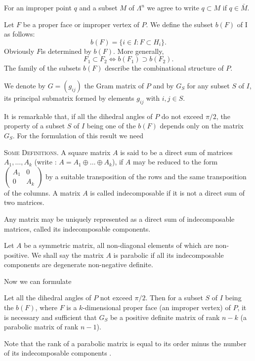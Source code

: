\begin{enumerate}
For an improper point $q$ and a subset $M$ of $\Lambda^{n}$ we agree to write $q \subset M$ if $q \in \bar{M}$.

Let $F$ be a proper face or improper vertex of $P$. We define the subset $b(F)$ of I as follows:
$$
b(F) = \{i \in I: F \subset H_i\}.
$$
Obviously $F$\pageoriginale is determined by $b(F)$. More generally,
$$
F_1 \subset F_2 \Leftrightarrow b(F_1) \supset b (F_2).
$$
The family of the subsets $b(F)$ describe the combinational structure of $P$.

We denote by $G = (g_{ij})$ the Gram matrix of $P$ and by $G_S$ for any subset $S$ of $I$, its principal submatrix formed by elements  $g_{ij}$ with $i, j \in S$.

It is remarkable that, if all the dihedral angles of $P$ do not exceed $\pi/2$, the property of a subset $S$ of $I$ being one of the $b(F)$ depends only on the matrix $G_S$. For the formulation of this result we need

\textsc{Some Definitions.} A square matrix $A$ is said to be a direct sum of matrices $A_1, \ldots, A_k$ (write : $A = A_1 \oplus \ldots \oplus A_k$),  if $A$ may be reduced to the form $\begin{pmatrix}
A_1 & 0 \\ 0 & A_k \end{pmatrix}$ by a suitable transposition of the rows and the same transposition of the columns. A matrix $A$ is called indecomposable if it is not a direct sum of two matrices. 

Any matrix may be uniquely represented as a direct sum of indecomposable matrices, called its indecomposable components. 

Let $A$ be a symmetric matrix, all non-diagonal elements of which are non-positive. We shall say the matrix $A$ is parabolic if all its indecomposable components are degenerate non-negative definite.

Now we can formulate

\begin{theorem}\label{art10-thm2.3}
Let all the dihedral angles of $P$ not exceed $\pi/2$. Then for a subset $S$ of $I$ being the $b(F)$, where $F$ is a $k$-dimensional proper face (\resp an improper vertex) of $P$, it is necessary and sufficient that $G_S$ be a positive definite matrix of rank $n - k$ (\resp a parabolic matrix of rank $n -1$). 
\end{theorem}

Note that the rank of a parabolic matrix is equal to its order minus the number of its indecomposable components \cite{art10-key1}.


\end{enumerate}
